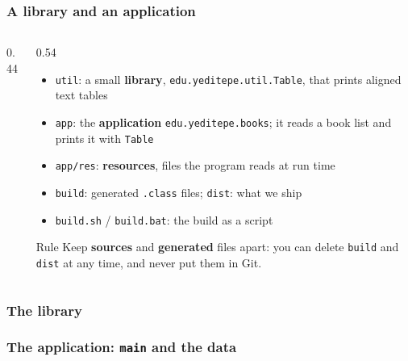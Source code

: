 \documentclass[aspectratio=169,10pt,compress]{beamer}
\begin{document}
\begin{frame}[t,fragile] \frametitle{A library and an application}
  \begin{columns}[T]
    \begin{column}{0.44\textwidth}
    \end{column}
    \begin{column}{0.54\textwidth}
      \begin{itemize}\small
        \item \texttt{util}: a small \textbf{library}, \texttt{edu.yeditepe.util.Table}, that prints aligned text tables
        \item \texttt{app}: the \textbf{application} \texttt{edu.yeditepe.books}; it reads a book list and prints it with \texttt{Table}
        \item \texttt{app/res}: \textbf{resources}, files the program reads at run time
        \item \texttt{build}: generated \texttt{.class} files; \texttt{dist}: what we ship
        \item \texttt{build.sh} / \texttt{build.bat}: the build as a script
      \end{itemize}
      \begin{block}{Rule}
        \small Keep \textbf{sources} and \textbf{generated} files apart: you can delete \texttt{build} and \texttt{dist} at any time,
        and never put them in Git.
      \end{block}
    \end{column}
  \end{columns}
\end{frame}




\begin{frame}[t,fragile] \frametitle{The library}
\end{frame}




\begin{frame}[t,fragile] \frametitle{The application: \texttt{main} and the data}
\end{frame}
\end{document}
